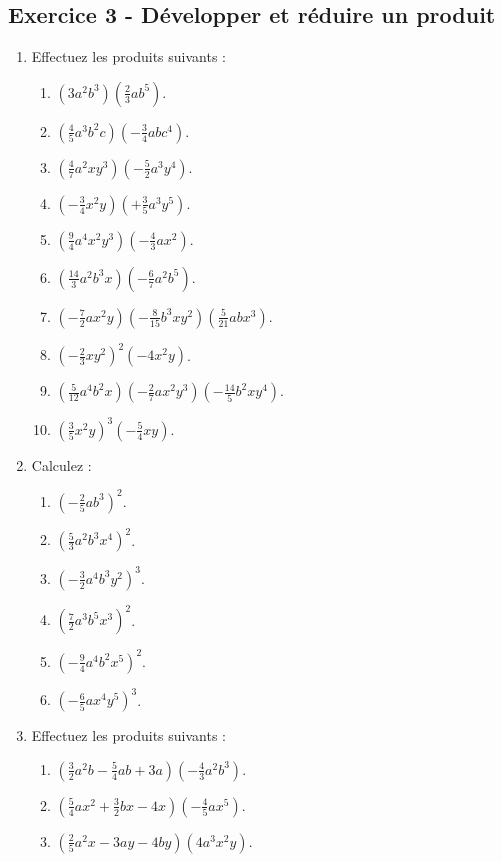 \documentclass[12 pt]{extarticle}
\theoremstyle{plain}
\begin{document}
\subsection*{Exercice 3 - Développer et réduire un produit}

\begin{enumerate}
\item Effectuez les produits suivants : 
\begin{enumerate}
\item $(3a^2b^3)\left(\frac23ab^5\right)$.
\item $\left(\frac45a^3b^2c\right)\left(-\frac34abc^4\right)$. 
\item $\left(\frac47a^2xy^3\right)\left(-\frac52a^3y^4\right)$.
\item $\left(-\frac34x^2y\right)\left(+\frac35a^3y^5\right)$.
\item $\left(\frac94a^4x^2y^3\right)\left(-\frac43ax^2\right)$. 
\item $\left(\frac{14}3a^2b^3x\right)\left(-\frac67a^2b^5\right)$. 
\item $\left(-\frac72ax^2y\right)\left(-\frac8{15}b^3xy^2\right)\left(\frac5{21}abx^3\right)$.
\item $\left(-\frac23xy^2\right)^2(-4x^2y)$.
\item $\left(\frac5{12}a^4b^2x\right)\left(-\frac27ax^2y^3\right)\left(-\frac{14}5b^2xy^4\right)$.
\item $\left(\frac35x^2y\right)^3\left(-\frac54xy\right)$.
\end{enumerate}
\item Calculez : \begin{enumerate}
\item $\left(-\frac25ab^3\right)^2$.
\item $\left(\frac53a^2b^3x^4\right)^2$.
\item $\left(-\frac32a^4b^3y^2\right)^3$.
\item $\left(\frac72a^3b^5x^3\right)^2$.
\item $\left(-\frac94a^4b^2x^5\right)^2$.
\item $\left(-\frac65ax^4y^5\right)^3$.
\end{enumerate}
\item Effectuez les produits suivants : 
\begin{enumerate}
\item $\left(\frac32a^2b-\frac54ab+3a\right)\left(-\frac43a^2b^3\right)$.
\item $\left(\frac54ax^2+\frac32bx-4x\right)\left(-\frac45ax^5\right)$.
\item $\left(\frac25a^2x-3ay-4by\right)(4a^3x^2y)$.

\end{enumerate}
\end{enumerate}
\end{document}
